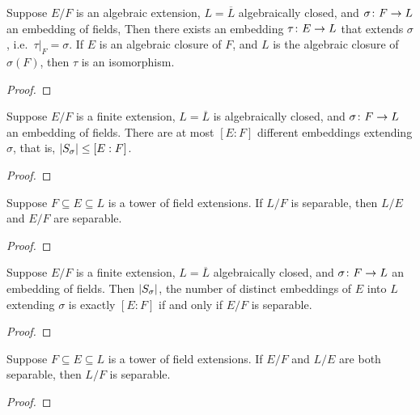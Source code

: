 \begin{proposition}\label{prop:algebraic-extension-hom}
    Suppose \(E/F\) is an algebraic extension,
    \(L = \overline{L}\) algebraically closed,
    and \(\sigma\colon F\to L\) an embedding of fields,
    Then there exists an embedding \(\tau\colon E\to L\) that extends \(\sigma\),
    i.e.\ \(\tau\vert_F = \sigma\).
    If \(E\) is an algebraic closure of \(F\),
    and \(L\) is the algebraic closure of \(\sigma(F)\),
    then \(\tau\) is an isomorphism.
\end{proposition}
\begin{proof}
\end{proof}
\begin{proposition}\label{prop:algebraic-extension-hom-count-bound}
    Suppose \(E/F\) is a finite extension,
    \(L = \overline{L}\) is algebraically closed,
    and \(\sigma\colon F\to L\) an embedding of fields.
    There are at most \([E:F]\) different embeddings extending \(\sigma\),
    that is, \(\abs{S_\sigma} \leq [E:F]\).
\end{proposition}
\begin{proof}
\end{proof}
\begin{proposition}\label{prop:intermediate-field-separable}
    Suppose \(F \subseteq E \subseteq L\) is a tower of field extensions.
    If \(L/F\) is separable, then \(L/E\) and \(E/F\) are separable.
\end{proposition}
\begin{proof}
\end{proof}
\begin{theorem}\label{thm:algebraic-extension-hom-count}
    Suppose \(E/F\) is a finite extension,
    \(L = \overline{L}\) algebraically closed,
    and \(\sigma\colon F\to L\) an embedding of fields.
    Then \(\abs{S_\sigma}\),
    the number of distinct embeddings of \(E\) into \(L\) extending \(\sigma\)
    is exactly \([E:F]\) if and only if \(E/F\) is separable.
\end{theorem}
\begin{proof}
\end{proof}

\begin{theorem}\label{thm:separable-transitive}
    Suppose \(F \subseteq E \subseteq L\) is a tower of field extensions.
    If \(E/F\) and \(L/E\) are both separable,
    then \(L/F\) is separable.
\end{theorem}
\begin{proof}
\end{proof}

